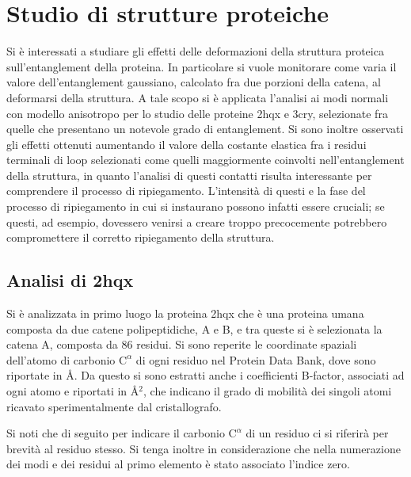 \chapter{Studio di strutture proteiche}
Si è interessati a studiare gli effetti delle deformazioni della struttura proteica sull'entanglement della proteina. In particolare si vuole monitorare come varia il valore dell'entanglement gaussiano, calcolato fra due porzioni della catena, al deformarsi della struttura. 
A tale scopo si è applicata l'analisi ai modi normali con modello anisotropo per lo studio delle proteine 2hqx e 3cry, selezionate fra quelle che presentano un notevole grado di entanglement.
Si sono inoltre osservati gli effetti ottenuti aumentando il valore della costante elastica fra i residui terminali di loop selezionati come quelli maggiormente coinvolti nell'entanglement della struttura, in quanto l'analisi di questi contatti risulta interessante per comprendere il processo di ripiegamento. L'intensità di questi e la fase del processo di ripiegamento in cui si instaurano possono infatti essere cruciali; se questi, ad esempio, dovessero venirsi a creare troppo precocemente potrebbero compromettere il corretto ripiegamento della struttura. \cite{preprint}

\section{Analisi di 2hqx} 
Si è analizzata in primo luogo la proteina 2hqx che è una proteina umana composta da due catene polipeptidiche, A e B, e tra queste si è selezionata la catena A, composta da 86 residui. Si sono reperite le coordinate spaziali dell'atomo di carbonio $ \mathrm{C}^{\alpha} $ di ogni residuo nel Protein Data Bank, dove sono riportate in \AA. Da questo si sono estratti anche i coefficienti B-factor, associati ad ogni atomo e riportati in \AA$^2$, che indicano il grado di mobilità dei singoli atomi ricavato sperimentalmente dal cristallografo. 

Si noti che di seguito per indicare il carbonio $ \mathrm{C}^{\alpha} $ di un residuo ci si riferirà per brevità al residuo stesso. Si tenga inoltre in considerazione che nella numerazione dei modi e dei residui al primo elemento è stato associato l'indice zero.

